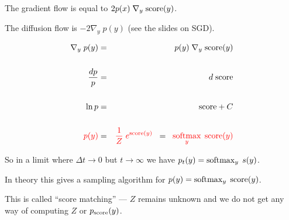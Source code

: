 {

The gradient flow is equal to $ 2 p(x) \;\nabla_y \;\mathrm{score}(y)$.

\vfill
The diffusion flow is  $- 2 \nabla _y\;p(y)$ (see the slides on SGD).

\vspace{-2ex}
\begin{eqnarray*}
\nabla_y\; p(y) & = & p(y)\; \nabla_y\; \mathrm{score}(y) \\
\\
\frac{dp}{p} & = & d\;\mathrm{score} \\
\\
\ln p & = & \mathrm{score} + C \\
\\
{\color{red} p(y)} & = & {\color{red} \frac{1}{Z}\;e^{\mathrm{score}(y)}} \;\;= \;\;{\color{red} \operatorname*{softmax}_y\;\mathrm{score}(y)}
\end{eqnarray*}


So in a limit where $\Delta t \rightarrow 0$ but $t \rightarrow \infty$ we have $p_t(y) = \operatorname*{softmax}_y\;s(y)$.

\vfill
In theory this gives a sampling algorithm for $p(y) = \operatorname*{softmax}_y \;\mathrm{score}(y)$.

\vfill
This is called ``score matching'' --- $Z$ remains unknown and we do not get any way of computing $Z$ or $p_{\mathrm{score}}(y)$.

}

